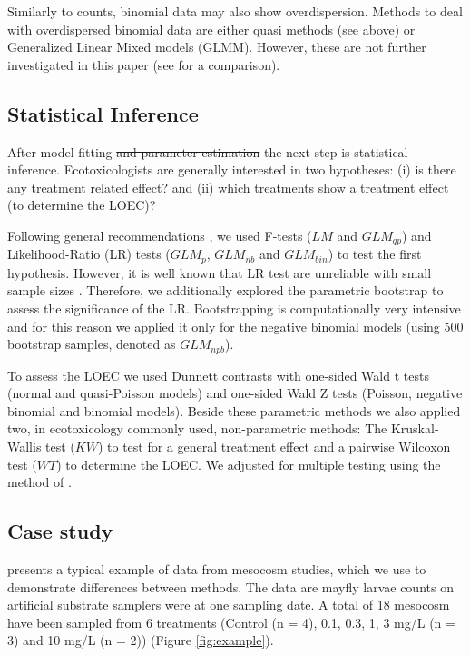 \documentclass[twocolumn, natbib]{svjour3}
\providecommand{\DIFdel}[1]{{\protect\color{red}\sout{#1}}}                      %
\providecommand{\DIFdelbegin}{} %
\providecommand{\DIFdelend}{} %
\begin{document}
Similarly to counts, binomial data may also show overdispersion. 
Methods to deal with overdispersed binomial data are either quasi methods (see above) or Generalized Linear Mixed models (GLMM).
However, these are not further investigated in this paper (see \citet{warton_arcsine_2011} for a comparison).


\subsection{Statistical Inference}
After model fitting \DIFdelbegin \DIFdel{and parameter estimation }\DIFdelend the next step is statistical inference.
Ecotoxicologists are generally interested in two hypotheses: (i) is there any treatment related effect? and (ii) which treatments show a treatment effect (to determine the LOEC)?

Following general recommendations \citep{bolker_generalized_2009,faraway_extending_2006}, we used F-tests ($LM$ and $GLM_{qp}$) and Likeli\-hood-Ratio (LR) tests ($GLM_p$, $GLM_{nb}$ and $GLM_{bin}$) to test the first hypothesis.
However, it is well known that LR test are unreliable with small sample sizes \citep{wilks_large-sample_1938}.
Therefore, we additionally explored the parametric bootstrap \citep{faraway_extending_2006} to assess the significance of the LR.
Bootstrapping is computationally very intensive and for this reason we applied it only for the negative binomial models (using 500 bootstrap samples, denoted as $GLM_{npb}$).

To assess the LOEC we used Dunnett contrasts \citep{dunnett_multiple_1955} with one-sided Wald t tests (normal and quasi-Poisson models) and one-sided Wald Z tests (Poisson, negative binomial and binomial models).
Beside these parametric methods we also applied two, in ecotoxicology commonly used, non-parametric methods: The Kruskal-Wallis test  ($KW$) to test for a general treatment effect and a pairwise Wilcoxon test ($WT$) to determine the LOEC.
We adjusted for multiple testing using the method of \citet{holm_simple_1979}.



\subsection{Case study}
\citet{brock_minimum_2015} presents a typical example of data from mesocosm studies, which we use to demonstrate differences between methods.
The data are mayfly larvae counts on artificial substrate samplers were at one sampling date. 
A total of 18 mesocosm have been sampled from 6 treatments (Control (n = 4), 0.1, 0.3, 1, 3 mg/L (n = 3) and 10 mg/L (n = 2)) (Figure \ref{fig:example}).
\end{document}
